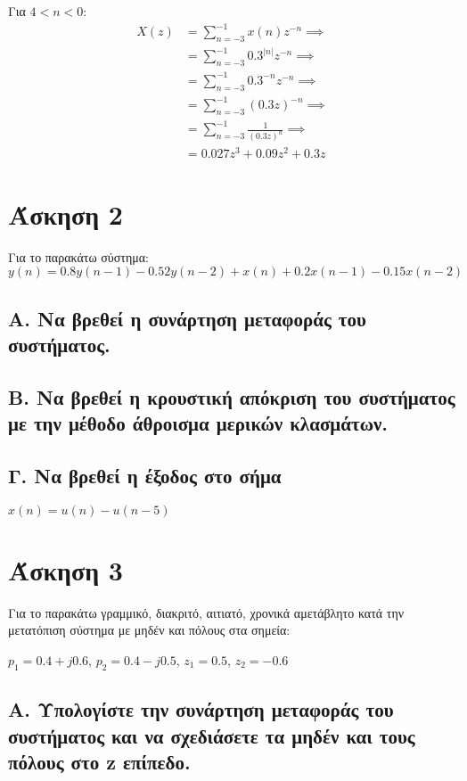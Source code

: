 \documentclass[12pt]{turabian-researchpaper}
\begin{document}
Για $ 4 < n < 0 $:
\begin{equation*}
    \begin{aligned}
        X(z) & = \sum_{n = -3}^{ -1 } x(n)z^{-n}              \implies \\
             & = \sum_{n = -3}^{ -1 } 0.3^{|n|} z^{-n}        \implies \\
             & = \sum_{n = -3}^{ -1 } 0.3^{-n} z^{-n}         \implies \\
             & = \sum_{n = -3}^{ -1 } (0.3 z)^{ -n }          \implies \\
             & = \sum_{n = -3}^{ -1 } \frac{ 1 }{ (0.3 z)^n } \implies \\
             & = 0.027 z^3 + 0.09 z^2 + 0.3 z
    \end{aligned}
\end{equation*}


\newpage\section{Άσκηση 2}

Για το παρακάτω σύστημα: $$ y(n) = 0.8y(n-1) - 0.52y(n-2) + x(n) + 0.2x(n-1) - 0.15x(n-2) $$
\subsection{Α. Να βρεθεί η συνάρτηση μεταφοράς του συστήματος.}
\subsection{Β. Να βρεθεί η κρουστική απόκριση του συστήματος με την μέθοδο άθροισμα μερικών κλασμάτων.}
\subsection{Γ. Να βρεθεί η έξοδος στο σήμα}
$x(n)=u(n)-u(n-5)$

\newpage\section{Άσκηση 3}
Για το παρακάτω γραμμικό, διακριτό, αιτιατό,  χρονικά αμετάβλητο κατά την μετατόπιση σύστημα με μηδέν και πόλους στα σημεία:

$p_1 = 0.4 + j0.6$, $p_2 = 0.4 - j0.5$, $z_1 = 0.5 $, $z_2 = -0.6$

\subsection{A. Υπολογίστε την συνάρτηση μεταφοράς του συστήματος και να σχεδιάσετε τα μηδέν και τους πόλους στο z επίπεδο.}
\end{document}
